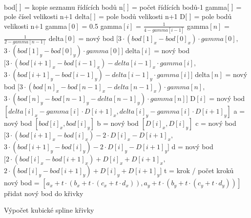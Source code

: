 \documentclass[12pt]{scrartcl}
\begin{document}
\paragraph{}
\begin{algorithm}[H]
 bod$[\nobreakspace ]$ = kopie seznamu řídících bodů\;
 n$[\nobreakspace ]$ = počet řídících bodů-1\;
 gamma$[\nobreakspace ]$ = pole čísel velikosti n+1\;
 delta$[\nobreakspace ]$ = pole bodů velikosti n+1\;
 D$[\nobreakspace ]$ = pole bodů velikosti n+1\;
 gamma$[0]$ = 0.5\;
  {
   gamma$[i]$ = $\frac{1}{4 - gamma[i-1]}$ \;
 }
 gamma$[n]$ = $\frac{1}{2 - gamma[n-1]}$\;
 delta$[0]$ = nový bod $[ 3 \cdot (bod[1]_x - bod[0]_x) \cdot gamma[0], $ \\ \nobreakspace \nobreakspace \nobreakspace \nobreakspace \nobreakspace $  3 \cdot (bod[1]_y - bod[0]_y) \cdot gamma[0] ] $\; 
  {
    delta$[i]$ = nový bod $[ 3 \cdot (bod[i+1]_x - bod[i-1]_x) - delta[i-1]_x \cdot gamma[i],$ \\ \nobreakspace \nobreakspace \nobreakspace \nobreakspace \nobreakspace $ 3 \cdot (bod[i+1]_y - bod[i-1]_y) - delta[i-1]_y \cdot gamma[i] ] $\;
 }
 delta$[n]$ = nový bod $[ 3 \cdot (bod[n]_x - bod[n-1]_x - delta[n-1]_x) \cdot gamma[n],$ \\ \nobreakspace \nobreakspace \nobreakspace \nobreakspace \nobreakspace $ 3 \cdot (bod[n]_y - bod[n-1]_y - delta[n-1]_y) \cdot gamma[n]] $\;
  {
 	D$[i]$ = nový bod $[delta[i]_x - gamma[i] \cdot D[i + 1]_x, delta[i]_y - gamma[i] \cdot D[i + 1]_y] $
 }
  {
   a = nový bod $[bod[i]_x, bod[i]_y]$ \;
   b = nový bod $[D[i]_x, D[i]_y]$ \;
   c = nový bod $[ 3 \cdot (bod[i+1]_x - bod[i]_x) - 2 \cdot D[i]_x - D[i+1]_x,$ \\ \nobreakspace \nobreakspace \nobreakspace \nobreakspace \nobreakspace $ 3 \cdot (bod[i+1]_y - bod[i]_y) - 2 \cdot D[i]_y - D[i+1]_y ]$\;
   d = nový bod $[ 2 \cdot (bod[i]_x - bod[i+1]_x) + D[i]_x + D[i+1]_x,$ \\ \nobreakspace \nobreakspace \nobreakspace \nobreakspace \nobreakspace $ 2 \cdot (bod[i]_y - bod[i+1]_y) + D[i]_y + D[i+1]_y ]$\;
  {
   t = krok / počet kroků\;
   nový bod = $\left[ a_x + t \cdot \left( b_x + t \cdot \left( c_x + t \cdot d_x \right) \right), a_y + t \cdot \left( b_y + t \cdot \left( c_y + t \cdot d_y \right) \right) \right] $\;
   přidat nový bod do křivky\;
  }
 }
 \caption{Výpočet kubické spline křivky}
\end{algorithm}
\end{document}
